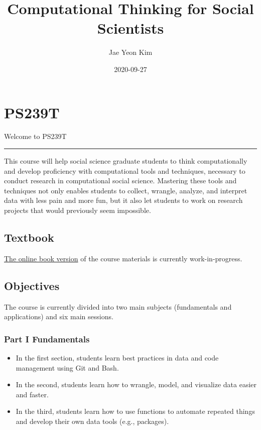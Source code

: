 \documentclass[
]{book}
\title{Computational Thinking for Social Scientists}
\author{Jae Yeon Kim}
\date{2020-09-27}
\begin{document}
\maketitle

{
\setcounter{tocdepth}{1}
\tableofcontents
}
\hypertarget{ps239t}{%
\chapter{PS239T}\label{ps239t}}

Welcome to PS239T

\begin{center}\rule{0.5\linewidth}{0.5pt}\end{center}

This course will help social science graduate students to think computationally and develop proficiency with computational tools and techniques, necessary to conduct research in computational social science. Mastering these tools and techniques not only enables students to collect, wrangle, analyze, and interpret data with less pain and more fun, but it also let students to work on research projects that would previously seem impossible.

\hypertarget{textbook}{%
\section{Textbook}\label{textbook}}

\href{https://jaeyk.github.io/PS239T/}{The online book version} of the course materials is currently work-in-progress.

\hypertarget{objectives}{%
\section{Objectives}\label{objectives}}

The course is currently divided into two main subjects (fundamentals and applications) and six main sessions.

\hypertarget{part-i-fundamentals}{%
\subsection{Part I Fundamentals}\label{part-i-fundamentals}}

\begin{itemize}
\item
  In the first section, students learn best practices in data and code management using Git and Bash.
\item
  In the second, students learn how to wrangle, model, and visualize data easier and faster.
\item
  In the third, students learn how to use functions to automate repeated things and develop their own data tools (e.g., packages).
\end{itemize}
\end{document}
